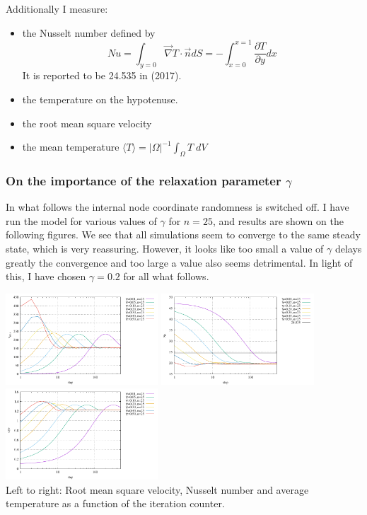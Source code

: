 Additionally I measure:
\begin{itemize}
\item the Nusselt number defined by 
\[
Nu
=\int_{y=0} \vec{\nabla}T \cdot \vec{n} dS  
=-\int_{x=0}^{x=1} \frac{\partial T}{\partial y} dx 
\]
It is reported to be 24.535 in \textcite{jolm17} (2017).
\item the temperature on the hypotenuse.
\item the root mean square velocity
\item the mean temperature $\langle T \rangle = |\Omega|^{-1} \int_\Omega T \; dV$
\end{itemize}

\subsubsection*{On the importance of the relaxation parameter $\gamma$}

In what follows the internal node coordinate randomness is switched off.
I have run the model for various values of $\gamma$ for $n=25$, and results are shown on the 
following figures. We see that all simulations seem to converge to the same 
steady state, which is very reassuring. However, it looks like too small a value of $\gamma$
delays greatly the convergence and too large a value also seems detrimental. 
In light of this, I have chosen $\gamma=0.2$ for all what follows.

\begin{center}
\includegraphics[width=5.7cm]{python_codes/fieldstone_51/images/vrms_gammas.pdf}
\includegraphics[width=5.7cm]{python_codes/fieldstone_51/images/Nu_gammas.pdf}
\includegraphics[width=5.7cm]{python_codes/fieldstone_51/images/avrgT_gammas.pdf}\\
{\captionfont Left to right: Root mean square velocity, Nusselt number and average temperature as a function 
of the iteration counter.}
\end{center}

